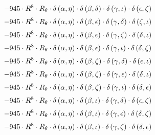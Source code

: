 \begin{subequations}
\begin{gather}
 \\[0.2em] \notag 		 - 945 \cdot R^{8} \cdot R_{\theta{}} \cdot \delta{}\left(\alpha{}, \eta{}\right) \cdot \delta{}\left(\beta{}, \delta{}\right) \cdot \delta{}\left(\gamma{}, \iota{}\right) \cdot \delta{}\left(\epsilon{}, \zeta{}\right) 
 \\[0.2em] \notag 		 - 945 \cdot R^{8} \cdot R_{\theta{}} \cdot \delta{}\left(\alpha{}, \eta{}\right) \cdot \delta{}\left(\beta{}, \epsilon{}\right) \cdot \delta{}\left(\gamma{}, \delta{}\right) \cdot \delta{}\left(\zeta{}, \iota{}\right) 
 \\[0.2em] \notag 		 - 945 \cdot R^{8} \cdot R_{\theta{}} \cdot \delta{}\left(\alpha{}, \eta{}\right) \cdot \delta{}\left(\beta{}, \epsilon{}\right) \cdot \delta{}\left(\gamma{}, \zeta{}\right) \cdot \delta{}\left(\delta{}, \iota{}\right) 
 \\[0.2em] \notag 		 - 945 \cdot R^{8} \cdot R_{\theta{}} \cdot \delta{}\left(\alpha{}, \eta{}\right) \cdot \delta{}\left(\beta{}, \epsilon{}\right) \cdot \delta{}\left(\gamma{}, \iota{}\right) \cdot \delta{}\left(\delta{}, \zeta{}\right) 
 \\[0.2em] \notag 		 - 945 \cdot R^{8} \cdot R_{\theta{}} \cdot \delta{}\left(\alpha{}, \eta{}\right) \cdot \delta{}\left(\beta{}, \zeta{}\right) \cdot \delta{}\left(\gamma{}, \delta{}\right) \cdot \delta{}\left(\epsilon{}, \iota{}\right) 
 \\[0.2em] \notag 		 - 945 \cdot R^{8} \cdot R_{\theta{}} \cdot \delta{}\left(\alpha{}, \eta{}\right) \cdot \delta{}\left(\beta{}, \zeta{}\right) \cdot \delta{}\left(\gamma{}, \epsilon{}\right) \cdot \delta{}\left(\delta{}, \iota{}\right) 
 \\[0.2em] \notag 		 - 945 \cdot R^{8} \cdot R_{\theta{}} \cdot \delta{}\left(\alpha{}, \eta{}\right) \cdot \delta{}\left(\beta{}, \zeta{}\right) \cdot \delta{}\left(\gamma{}, \iota{}\right) \cdot \delta{}\left(\delta{}, \epsilon{}\right) 
 \\[0.2em] \notag 		 - 945 \cdot R^{8} \cdot R_{\theta{}} \cdot \delta{}\left(\alpha{}, \eta{}\right) \cdot \delta{}\left(\beta{}, \iota{}\right) \cdot \delta{}\left(\gamma{}, \delta{}\right) \cdot \delta{}\left(\epsilon{}, \zeta{}\right) 
 \\[0.2em] \notag 		 - 945 \cdot R^{8} \cdot R_{\theta{}} \cdot \delta{}\left(\alpha{}, \eta{}\right) \cdot \delta{}\left(\beta{}, \iota{}\right) \cdot \delta{}\left(\gamma{}, \epsilon{}\right) \cdot \delta{}\left(\delta{}, \zeta{}\right) 
 \\[0.2em] \notag 		 - 945 \cdot R^{8} \cdot R_{\theta{}} \cdot \delta{}\left(\alpha{}, \eta{}\right) \cdot \delta{}\left(\beta{}, \iota{}\right) \cdot \delta{}\left(\gamma{}, \zeta{}\right) \cdot \delta{}\left(\delta{}, \epsilon{}\right) 

\end{gather}
\end{subequations}

